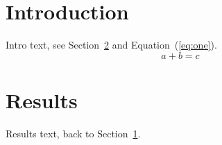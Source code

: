 \documentclass{article}
\begin{document}
\section{Introduction}\label{sec:intro}
Intro text, see Section~\ref{sec:results} and Equation~(\ref{eq:one}).
\begin{equation}\label{eq:one}
a+b=c
\end{equation}
\section{Results}\label{sec:results}
Results text, back to Section~\ref{sec:intro}.
\end{document}
